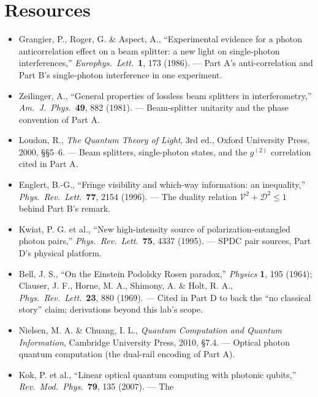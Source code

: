 \documentclass[a4paper,11pt]{article}
\begin{document}
\section{Resources}

\begin{itemize}
    \item Grangier, P., Roger, G. \& Aspect, A., ``Experimental evidence for a
          photon anticorrelation effect on a beam splitter: a new light on
          single-photon interferences,'' \textit{Europhys.\ Lett.}\ \textbf{1}, 173
          (1986). --- Part A's anti-correlation and Part B's single-photon
          interference in one experiment.
    \item Zeilinger, A., ``General properties of lossless beam splitters in
          interferometry,'' \textit{Am.\ J.\ Phys.}\ \textbf{49}, 882 (1981). ---
          Beam-splitter unitarity and the phase convention of Part A.
    \item Loudon, R., \textit{The Quantum Theory of Light}, 3rd ed., Oxford
          University Press, 2000, \S\S 5--6. --- Beam splitters, single-photon
          states, and the $g^{(2)}$ correlation cited in Part A.
    \item Englert, B.-G., ``Fringe visibility and which-way information: an
          inequality,'' \textit{Phys.\ Rev.\ Lett.}\ \textbf{77}, 2154 (1996). ---
          The duality relation $\mathcal{V}^2 + \mathcal{D}^2 \leq 1$ behind
          Part B's remark.
    \item Kwiat, P. G. et al., ``New high-intensity source of
          polarization-entangled photon pairs,'' \textit{Phys.\ Rev.\ Lett.}\
          \textbf{75}, 4337 (1995). --- SPDC pair sources, Part D's physical
          platform.
    \item Bell, J. S., ``On the Einstein Podolsky Rosen paradox,''
          \textit{Physics} \textbf{1}, 195 (1964); Clauser, J. F., Horne, M. A.,
          Shimony, A. \& Holt, R. A., \textit{Phys.\ Rev.\ Lett.}\ \textbf{23}, 880
          (1969). --- Cited in Part D to back the ``no classical story'' claim;
          derivations beyond this lab's scope.
    \item Nielsen, M. A. \& Chuang, I. L., \textit{Quantum Computation and Quantum
          Information}, Cambridge University Press, 2010, \S 7.4. --- Optical
          photon quantum computation (the dual-rail encoding of Part A).
    \item Kok, P. et al., ``Linear optical quantum computing with photonic
          qubits,'' \textit{Rev.\ Mod.\ Phys.}\ \textbf{79}, 135 (2007). --- The

\end{itemize}
\end{document}
